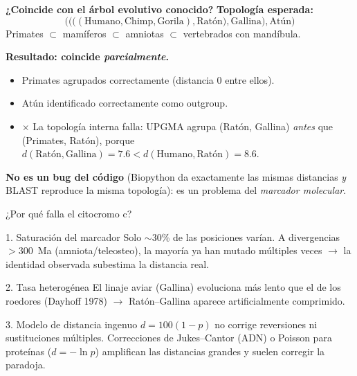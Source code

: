 \documentclass[10pt,aspectratio=169]{beamer}
\begin{document}
\begin{frame}{\textbf{¿Coincide con el \'arbol evolutivo conocido?}}
\textbf{Topolog\'ia esperada:}
\[
\bigl(\bigl(\bigl((\text{Humano},\text{Chimp},\text{Gorila}),\text{Rat\'on}\bigr),\text{Gallina}\bigr),\text{At\'un}\bigr)
\]
Primates $\subset$ mam\'iferos $\subset$ amniotas $\subset$ vertebrados con mand\'ibula.

\bigskip
\textbf{Resultado: coincide \emph{parcialmente}.}
\begin{itemize}
  \item \alert{\checkmark} Primates agrupados correctamente (distancia 0 entre ellos).
  \item \alert{\checkmark} At\'un identificado correctamente como outgroup.
  \item \alert{$\boldsymbol{\times}$} La topolog\'ia interna falla: UPGMA agrupa (Rat\'on, Gallina) \emph{antes} que (Primates, Rat\'on), porque $d(\text{Rat\'on},\text{Gallina}) = 7.6 < d(\text{Humano},\text{Rat\'on}) = 8.6$.
\end{itemize}

\smallskip
\textbf{No es un bug del c\'odigo} (Biopython da exactamente las mismas distancias \emph{y} BLAST reproduce la misma topolog\'ia): es un problema del \emph{marcador molecular}.
\end{frame}

\begin{frame}{¿Por qu\'e falla el citocromo c?}
\begin{block}{1. Saturaci\'on del marcador}
Solo $\sim$30\% de las posiciones var\'ian. A divergencias $>$300~Ma (amniota/teleosteo), la mayor\'ia ya han mutado m\'ultiples veces $\to$ la identidad observada subestima la distancia real.
\end{block}
\begin{block}{2. Tasa heterog\'enea}
El linaje aviar (Gallina) evoluciona m\'as lento que el de los roedores (Dayhoff 1978) $\to$ Rat\'on--Gallina aparece artificialmente comprimido.
\end{block}
\begin{block}{3. Modelo de distancia ingenuo}
$d = 100(1-p)$ no corrige reversiones ni sustituciones m\'ultiples. Correcciones de Jukes--Cantor (ADN) o Poisson para prote\'inas ($d = -\ln p$) amplifican las distancias grandes y suelen corregir la paradoja.
\end{block}
\end{frame}

\end{document}
